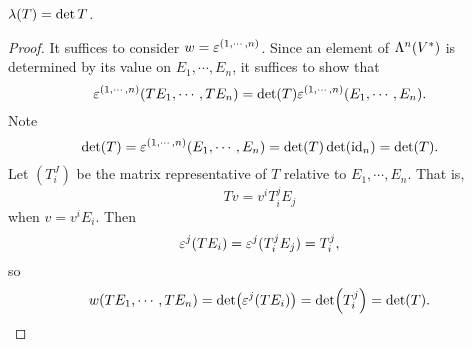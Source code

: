 \begin{proposition}\label{14.9}
    $\lambda(T) = \det T$.
\end{proposition}
\begin{proof}
    It suffices to consider $w = \varepsilon^{(1,\cdots,n)}$. Since an element of $\Lambda^n(V^*)$ is determined by its value on $E_1,\cdots, E_n$, it suffices to show that $$\varepsilon^{(1,\cdots,n)}(TE_1,\cdots,TE_n) = \det(T)\varepsilon^{(1,\cdots,n)}(E_1,\cdots,E_n).$$
    Note 
    $$\det(T) = \varepsilon^{(1,\cdots,n)}(E_1,\cdots,E_n) = \det(T)\det(\mathrm{id}_n) = \det(T).$$
    Let $(T_i^J)$ be the matrix representative of $T$ relative to $E_1,\cdots,E_n$. That is, 
    $$Tv = v^iT_i^jE_j$$ when $v = v^iE_i$. 
    Then $$\varepsilon^j(TE_i) = \varepsilon^j(T_i^jE_j)
    = T_i^j, $$ so 
    $$w(TE_1,\cdots,TE_n) = \det(\varepsilon^j(TE_i)) = \det(T_i^j) = \det (T). $$
\end{proof}

